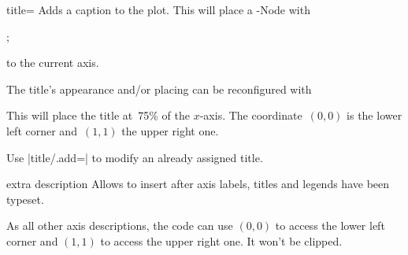 \begin{pgfplotskey}{title=}
Adds a caption to the plot. This will place a \Tikz-Node with
\begin{codeexample}
;
\end{codeexample}
to the current axis.
\begin{codeexample}[]
%
\end{codeexample}
% 
The title's appearance and/or placing can be reconfigured with
\begin{codeexample}
\end{codeexample}
This will place the title at~75\% of the $x$-axis. The coordinate~$(0,0)$ is the lower left corner and~$(1,1)$ the upper right one.

Use |title/.add=| to modify an already assigned title.
\end{pgfplotskey}

\begin{pgfplotscodekey}{extra description}
Allows to insert  after axis labels, titles and legends have been typeset.

As all other axis descriptions, the code can use $(0,0)$ to access the lower left corner and $(1,1)$ to access the upper right one. It won't be clipped.
\begin{codeexample}[]
\end{codeexample}
\end{pgfplotscodekey}

